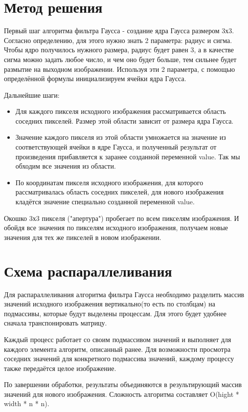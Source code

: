 \documentclass{report}
\begin{document}
\section*{Метод решения}
Первый шаг алгоритма фильтра Гаусса - создание ядра Гаусса размером 3х3. Согласно определению, для этого нужно знать 2 параметра: радиус и сигма. Чтобы ядро получилось нужного размера, радиус будет равен 3, а в качестве сигма можно задать любое число, и чем оно будет больше, тем сильнее будет размытие на выходном изображении. Используя эти 2 параметра, с помощью определённой формулы инициализируем ячейки ядра Гаусса.
\par Дальнейшие шаги:
\begin{itemize}
\item Для каждого пикселя исходного изображения рассматривается область соседних пикселей. Размер этой области зависит от размера ядра Гаусса.
\item Значение каждого пикселя из этой области умножается на значение из соответствующей ячейки в ядре Гаусса, и полученный результат от произведения прибавляется к заранее созданной переменной value. Так мы обходим все значения из области.
\item По координатам пикселя исходного изображения, для которого рассматривалась область соседних пикселей, для нового изображения кладётся значение специально созданной переменной value.
\end{itemize}
\par Окошко 3х3 пикселя ("апертура") пробегает по всем пикселям изображения. И обойдя все значения по пикселям исходного изображения, получаем новые значения для тех же пикселей в новом изображении.
\newpage

\section*{Схема распараллеливания}
Для распараллеливания алгоритма фильтра Гаусса необходимо разделить массив значений исходного изображения вертикально(то есть по столбцам) на подмассивы, которые будут выделены процессам. Для этого будет удобнее сначала транспонировать матрицу.
\par Каждый процесс работает со своим подмассивом значений и выполняет для каждого элемента алгоритм, описанный ранее. Для возможности просмотра соседних значений для конкретного подмассива значений, каждому процессу также передаётся целое изображение.
\par По завершении обработки, результаты объединяются в результирующий массив значений для нового изображения. Сложность алгоритма составляет O(hight * width * n * n).
\newpage
\end{document}
